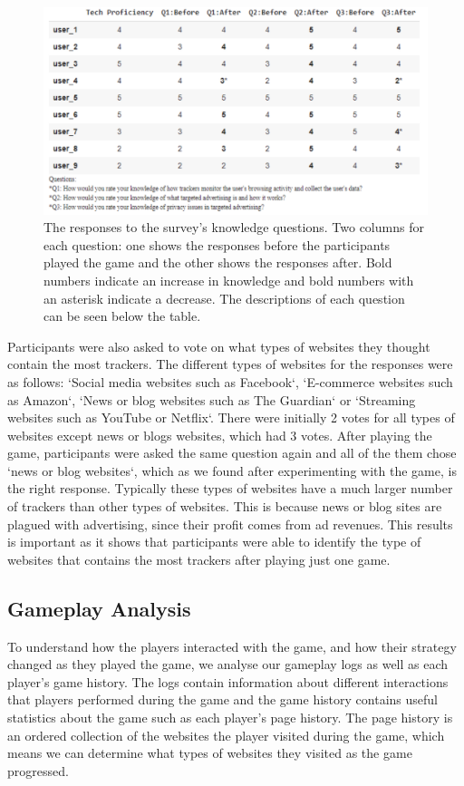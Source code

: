 \documentclass{l4proj}
\begin{document}
\begin{figure}
    \centering
    \includegraphics[width=1\linewidth]{images/know.pdf}    

    \caption{The responses to the survey's knowledge questions. Two columns for each question: one shows the responses before the participants played the game and the other shows the responses after. Bold numbers indicate an increase in knowledge and bold numbers with an asterisk indicate a decrease. The descriptions of each question can be seen below the table.}

    \label{fig:know} 
\end{figure}

Participants were also asked to vote on what types of websites they thought contain the most trackers. The different types of websites for the responses were as follows: `Social media websites such as Facebook`, `E-commerce websites such as Amazon`, `News or blog websites such as The Guardian` or `Streaming websites such as YouTube or Netflix`. There were initially 2 votes for all types of websites except news or blogs websites, which had 3 votes. 
After playing the game, participants were asked the same question again and all of the them chose `news or blog websites`, which as we found after experimenting with the game, is the right response. Typically these types of websites have a much larger number of trackers than other types of websites. This is because news or blog sites are plagued with advertising, since their profit comes from ad revenues. This results is important as it shows that participants were able to identify the type of websites that contains the most trackers after playing just one game.

\subsection{Gameplay Analysis}
To understand how the players interacted with the game, and how their strategy changed as they played the game, we analyse our gameplay logs as well as each player's game history. The logs contain information about different interactions that players performed during the game and the game history contains useful statistics about the game such as each player's page history. The page history is an ordered collection of the websites the player visited during the game, which means we can determine what types of websites they visited as the game progressed. 
\end{document}
